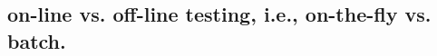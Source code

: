 \documentclass[11pt,a4paper]{article}
\begin{document}
\subsection{on-line vs. off-line testing, i.e., on-the-fly vs. batch.}

\end{document}
